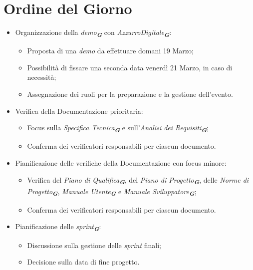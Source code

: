 

\section{Ordine del Giorno}

\begin{itemize}
    \item Organizzazione della \emph{demo}\textsubscript{\textit{\textbf{G}}} con \emph{AzzurroDigitale}\textsubscript{\textit{\textbf{G}}}:
    \begin{itemize}
        \item Proposta di una \emph{demo} da effettuare domani 19 Marzo;
        \item Possibilità di fissare una seconda data venerdì 21 Marzo, in caso di necessità;
        \item Assegnazione dei ruoli per la preparazione e la gestione dell'evento.
    \end{itemize}
    
    \item Verifica della Documentazione prioritaria:
    \begin{itemize}
        \item Focus sulla \emph{Specifica Tecnica}\textsubscript{\textit{\textbf{G}}} e sull'\emph{Analisi dei Requisiti}\textsubscript{\textit{\textbf{G}}};
        \item Conferma dei verificatori responsabili per ciascun documento.
    \end{itemize}
    
    \item Pianificazione delle verifiche della Documentazione con focus minore:
    \begin{itemize}
        \item Verifica del \emph{Piano di Qualifica}\textsubscript{\textit{\textbf{G}}}, del \emph{Piano di Progetto}\textsubscript{\textit{\textbf{G}}}, delle \emph{Norme di Progetto}\textsubscript{\textit{\textbf{G}}}, \emph{Manuale Utente}\textsubscript{\textit{\textbf{G}}} e \emph{Manuale Sviluppatore}\textsubscript{\textit{\textbf{G}}};
        \item Conferma dei verificatori responsabili per ciascun documento.
    \end{itemize}
    
    \item Pianificazione delle \emph{sprint}\textsubscript{\textit{\textbf{G}}}:
    \begin{itemize}
        \item Discussione sulla gestione delle \emph{sprint} finali;
        \item Decisione sulla data di fine progetto.
    \end{itemize}
   

\end{itemize}
